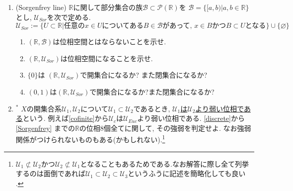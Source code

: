 \documentclass[dvipdfmx,a4paper,11pt]{article}
\newcommand{\R}{\mathbb{R}}
\newcommand{\N}{\mathbb{N}}
\theoremstyle{definition}
\begin{document}
\begin{enumerate}[label=\textbf{問}\ref*{sec-open}.\arabic*]
\item(Sorgenfrey line) \label{Sorgenfrey} $\R$に関して部分集合の族$\mathscr{B}\subset \mathcal{P}(\R)$を
$
\mathscr{B} = \{ [a, b) | a,b \in \R\}
$
とし, $\mathscr{U}_{Sor}$を次で定める. 
$$
\mathscr{U}_{Sor} := \{ U \subset \R | \text{任意の$x \in U$についてある$B \in \mathscr{B}$があって, $x \in B$かつ$B \subset U$となる}\} \cup \{  \varnothing \}
$$
	\begin{enumerate}	
	\setlength{\parskip}{0cm}
	\setlength{\itemsep}{0pt} 
	\item $(\R,\mathscr{B}  )$は位相空間とはならないことを示せ. 
	\item $(\R,\mathscr{U}_{Sor})$は位相空間になることを示せ.
	\item $\{ 0\}$は $(\R,\mathscr{U}_{Sor} )$で開集合になるか? また閉集合になるか?
	\item $(0,1)$は$(\R,\mathscr{U}_{Sor})$で開集合になるか?また閉集合になるか?
	\end{enumerate}

\item $^{*}$ $X$の開集合系$\mathscr{U}_1, \mathscr{U}_2$について$\mathscr{U}_1 \subset \mathscr{U}_2$であるとき, \underline{$\mathscr{U}_1$は$\mathscr{U}_2$より弱い位相である}という. 例えば\ref{cofinite}から$\mathscr{U}_c $は$\mathscr{U}_{Euc}$より弱い位相である.  
\ref{discrete}から\ref{Sorgenfrey} までの$\R$の位相8個全てに関して, その強弱を判定せよ. なお強弱関係がつけられないものもある(かもしれない).\footnote{$\mathscr{U}_1 \not \subset \mathscr{U}_2$かつ$\mathscr{U}_2 \not \subset\mathscr{U}_1$となることもあるためである.なお解答に際し全て列挙するのは面倒であれば$\mathscr{U}_1 \subset \mathscr{U}_2 \subset \mathscr{U}_3$というふうに記述を簡略化しても良い .} 





\end{enumerate}
\end{document}
